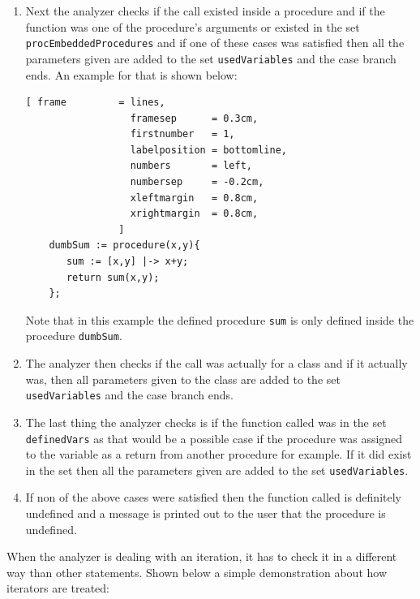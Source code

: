 \documentclass[11pt]{report}
\begin{document}
\begin{enumerate}
\item Next the analyzer checks if the call existed inside a procedure and if the function was one of the procedure's arguments or existed in the set \texttt{procEmbeddedProcedures} and if one of these cases was satisfied then all the parameters given are added to the set \texttt{usedVariables} and the case branch ends. An example for that is shown below: 
\begin{Verbatim}[ frame         = lines, 
                  framesep      = 0.3cm, 
                  firstnumber   = 1,
                  labelposition = bottomline,
                  numbers       = left,
                  numbersep     = -0.2cm,
                  xleftmargin   = 0.8cm,
                  xrightmargin  = 0.8cm,
                ]
    dumbSum := procedure(x,y){
       sum := [x,y] |-> x+y;
       return sum(x,y);
    };
\end{Verbatim}
Note that in this example the defined procedure \texttt{sum} is only defined inside the procedure \texttt{dumbSum}.

\item The analyzer then checks if the call was actually for a class and if it actually was, then all parameters given to the class are added to the set \texttt{usedVariables} and the case branch ends.

\item The last thing the analyzer checks is if the function called was in the set \texttt{definedVars} as that would be a possible case if the procedure was assigned to the variable as a return from another procedure for example. If it did exist in the set then all the parameters given are added to the set \texttt{usedVariables}.

\item If non of the above cases were satisfied then the function called is definitely undefined and a message is printed out to the user that the procedure is undefined.

\end{enumerate}

When the analyzer is dealing with an iteration, it has to check it in a different way than other statements. Shown below a simple demonstration about how iterators are treated:
\\
\end{document}
